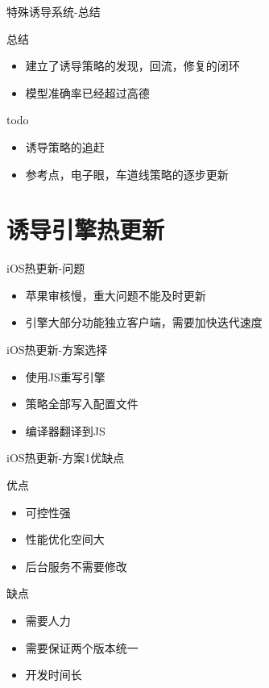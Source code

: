 \documentclass[10pt]{beamer}
\begin{document}
\begin{frame}{特殊诱导系统-总结}
	\begin{exampleblock}{总结}
		\begin{itemize}
			\item 建立了诱导策略的发现，回流，修复的闭环
			\item 模型准确率已经超过高德
		\end{itemize}
	\end{exampleblock}
	\begin{exampleblock}{todo}
		\begin{itemize}
			\item 诱导策略的追赶
			\item 参考点，电子眼，车道线策略的逐步更新
		\end{itemize}
	\end{exampleblock}
\end{frame}

\section{诱导引擎热更新}

\begin{frame}{iOS热更新-问题}
	\begin{itemize}
		\item 苹果审核慢，重大问题不能及时更新
		\item 引擎大部分功能独立客户端，需要加快迭代速度
	\end{itemize}
\end{frame}

\begin{frame}{iOS热更新-方案选择}
	\begin{itemize}
		\item 使用JS重写引擎
		\item 策略全部写入配置文件
		\item 编译器翻译到JS
	\end{itemize}
\end{frame}

\begin{frame}{iOS热更新-方案1优缺点}
	\begin{exampleblock}{优点}
		\begin{itemize}
			\item 可控性强
			\item 性能优化空间大
			\item 后台服务不需要修改
		\end{itemize}
	\end{exampleblock}
	\begin{exampleblock}{缺点}
		\begin{itemize}
			\item 需要人力
			\item 需要保证两个版本统一
			\item 开发时间长
		\end{itemize}
	\end{exampleblock}
\end{frame}
\end{document}
